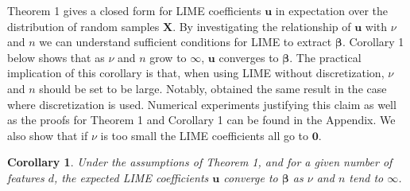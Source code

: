 \documentclass[12pt]{article}  %
\newtheorem{corollary}[theorem]{Corollary}
\begin{document}


             Theorem 1 gives a closed form for LIME coefficients $\boldsymbol{u}$ in expectation over the distribution of random samples $\mathbf{X}$. By investigating the relationship of $\boldsymbol{u}$ with $\nu$ and $n$ we can understand sufficient conditions for LIME to extract $\boldsymbol{\beta}$. Corollary 1 below shows that as $\nu$ and $n$ grow to $\infty$, $\boldsymbol{u}$ converges to $\boldsymbol{\beta}$. The practical implication of this corollary is that, when using LIME without discretization, $\nu$ and $n$ should be set to be large. Notably, \cite{garreau20theoretical} obtained the same result in the case where discretization is used. Numerical experiments justifying this claim as well as the proofs for Theorem 1 and Corollary 1 can be found in the Appendix. We also show that if $\nu$ is too small the LIME coefficients all go to $\mathbf{0}$.

            \begin{corollary}
                Under the assumptions of Theorem 1, and for a given number of features $d$, the expected LIME coefficients $\mathbf{u}$ converge to $\boldsymbol{\beta}$ as $\nu$ and $n$ tend to $ \infty$. 
            \end{corollary}
             
\end{document}
